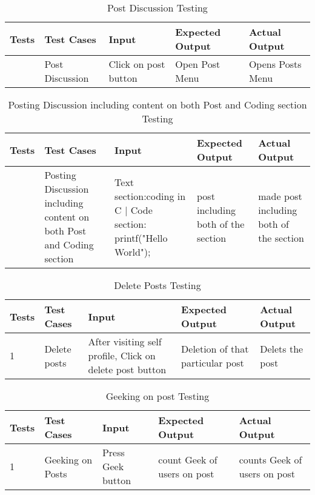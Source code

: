 \newpage
\begin{table}[H]
    \caption{Post Discussion Testing}
        \label{}
        \begin{tabularx}{\textwidth}{|>{\raggedright\arraybackslash}p{0.3in}|Y|Y|Y|Y|}
        \hline
        Tests & Test Cases & Input &Expected Output & Actual Output \\
         & Post Discussion& Click on post button& Open Post Menu& Opens Posts Menu \\
            \hline
\end{tabularx}
\end{table}


\begin{table}[H]
    \caption{Posting Discussion including content on both Post and Coding section Testing}
        \label{}
        \begin{tabularx}{\textwidth}{|>{\raggedright\arraybackslash}p{0.3in}|Y|Y|Y|Y|}
        \hline
        Tests & Test Cases & Input &Expected Output & Actual Output \\
         & Posting Discussion including content on both Post and Coding section& Text section:coding in C | Code section: printf("Hello World");& post including both of the section& made post including both of the section\\
            \hline
\end{tabularx}
\end{table}

\begin{table}[H]
    \caption{Delete Posts Testing}
        \label{}
    \begin{tabular}{|p{0.3in}|p{1.2in}|p{1.2in}|p{1.2in}|p{1in}|}
        \hline
        Tests & Test Cases & Input &Expected Output & Actual Output \\
        \hline
            1 & Delete posts&After visiting self profile, Click on delete post button& Deletion of that particular post& Delets the post \\
            \hline
\end{tabular}
\end{table}

\begin{table}[H]
    \caption{Geeking on post Testing}
        \label{}
    \begin{tabular}{|p{0.3in}|p{1.2in}|p{1.2in}|p{1.2in}|p{1in}|}
        \hline
        Tests & Test Cases & Input &Expected Output & Actual Output \\
        \hline
            1 & Geeking on Posts & Press Geek button& count Geek of users on post & counts Geek of users on post \\
            \hline
\end{tabular}
\end{table}

